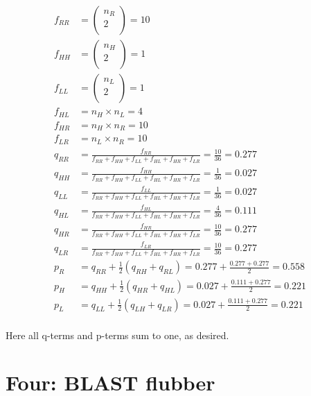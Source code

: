 \documentclass[10pt]{article} %
\begin{document}
\begin{align*}
  f_{RR} &= \begin{pmatrix} n_R\\ 2\\ \end{pmatrix} = 10\\
  f_{HH} &= \begin{pmatrix} n_H\\ 2\\ \end{pmatrix} = 1\\
  f_{LL} &= \begin{pmatrix} n_L\\ 2\\ \end{pmatrix} = 1\\
  f_{HL} &= n_H \times n_L = 4\\
  f_{HR} &= n_H \times n_R = 10\\
  f_{LR} &= n_L \times n_R = 10\\
  q_{RR} &= \frac{f_{RR}}{f_{RR} + f_{HH} + f_{LL} + f_{HL} + f_{HR} + f_{LR}}
  = \frac{10}{36} = 0.277\\
  q_{HH} &= \frac{f_{HH}}{f_{RR} + f_{HH} + f_{LL} + f_{HL} + f_{HR} + f_{LR}}
  = \frac{1}{36} = 0.027\\
  q_{LL} &= \frac{f_{LL}}{f_{RR} + f_{HH} + f_{LL} + f_{HL} + f_{HR} + f_{LR}}
  = \frac{1}{36} = 0.027\\
  q_{HL} &= \frac{f_{HL}}{f_{RR} + f_{HH} + f_{LL} + f_{HL} + f_{HR} + f_{LR}}
  = \frac{4}{36} = 0.111\\
  q_{HR} &= \frac{f_{HR}}{f_{RR} + f_{HH} + f_{LL} + f_{HL} + f_{HR} + f_{LR}}
  = \frac{10}{36} = 0.277\\
  q_{LR} &= \frac{f_{LR}}{f_{RR} + f_{HH} + f_{LL} + f_{HL} + f_{HR} + f_{LR}}
  = \frac{10}{36} = 0.277\\
  p_R &= q_{RR} + \frac{1}{2}\left(q_{RH} + q_{RL}\right) = 0.277 +
  \frac{0.277 + 0.277}{2} = 0.558\\
  p_H &= q_{HH} + \frac{1}{2}\left(q_{HR} + q_{HL}\right) = 0.027 +
  \frac{0.111 + 0.277}{2} = 0.221\\
  p_L &= q_{LL} + \frac{1}{2}\left(q_{LH} + q_{LR}\right) = 0.027 +
  \frac{0.111 + 0.277}{2} = 0.221\\
\end{align*}

Here all q-terms and p-terms sum to one, as desired.

\section{Four: BLAST flubber}
\end{document}
